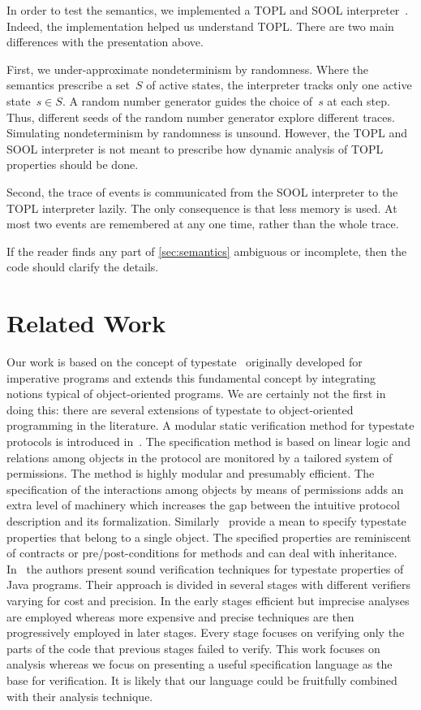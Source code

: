 \documentclass{sigplanconf} %
\theoremstyle{definition}
\theoremstyle{remark}
\begin{document}
In order to test the semantics, we implemented a TOPL and SOOL interpreter~\cite{web:topl.prototype}.
Indeed, the implementation helped us understand TOPL\null.
There are two main differences with the presentation above.

First, we under-approximate nondeterminism by randomness.
Where the semantics prescribe a set~$S$ of active states, the interpreter tracks only one active state~$s\in S$.
A random number generator guides the choice of~$s$ at each step.
Thus, different seeds of the random number generator explore different traces.
Simulating nondeterminism by randomness is unsound.
However, the TOPL and SOOL interpreter is not meant to prescribe how dynamic analysis of TOPL properties should be done.

Second, the trace of events is communicated from the SOOL interpreter to the TOPL interpreter lazily.
The only consequence is that less memory is used.
At most two events are remembered at any one time, rather than the whole trace.

If the reader finds any part of \autoref{sec:semantics} ambiguous or incomplete, then the code should clarify the details.

\section{Related Work}\label{sec:related} %
Our work is based on the concept of typestate~\cite{strom1986} originally developed for imperative programs and extends this fundamental concept by integrating notions typical of object-oriented programs. 
We are certainly not the first in doing this: there are several extensions of typestate to object-oriented programming in the literature.
A modular static verification method for typestate protocols is introduced in~\cite{dblp:conf/oopsla/bierhoffa07}. 
The specification method is based on linear logic and relations among objects in the protocol are monitored by a tailored system of permissions. 
The method is highly modular and presumably efficient. The specification of the interactions among objects by means of permissions adds an extra level of machinery which increases the gap between the intuitive protocol description and its formalization. Similarly~\cite{deline2004,dblp:conf/sigsoft/BierhoffA05} provide a mean to specify typestate properties that belong to a single object. The specified properties are reminiscent of contracts or pre/post-conditions for methods and
can deal with inheritance.
In~\cite{dblp:conf/issta/FinkYDRG06} the authors present sound verification techniques for typestate properties of Java  programs.
Their approach is divided in several stages with different verifiers varying for cost and precision.
In the early stages efficient but imprecise analyses are employed whereas
more expensive and precise techniques are then progressively employed in later stages.
Every stage focuses on verifying only the parts of the code that previous stages failed to verify.
This work focuses on analysis whereas we focus on presenting a useful specification language as the base for verification.
It is likely that our language could be fruitfully combined with their analysis technique.
\end{document}
